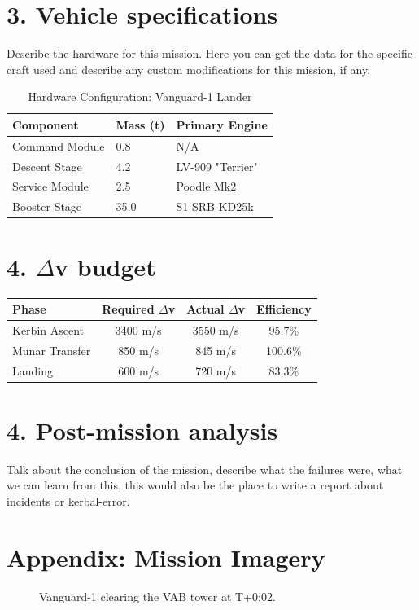 \documentclass[11pt, a4paper]{article}
\begin{document}
\section{3. Vehicle specifications}
Describe the hardware for this mission. Here you can get the data for
the specific craft used and describe any custom modifications for this
mission, if any.

\begin{table}[h]
    \centering
    \caption{Hardware Configuration: Vanguard-1 Lander}
    \vspace{2mm}
    \begin{tabular}{@{}lll@{}}
        \toprule
        \textbf{Component} & \textbf{Mass (t)} & \textbf{Primary Engine} \\ \midrule
        Command Module      & 0.8               & N/A                     \\
        Descent Stage       & 4.2               & LV-909 "Terrier"        \\
        Service Module      & 2.5               & Poodle Mk2              \\
        Booster Stage       & 35.0              & S1 SRB-KD25k            \\ \bottomrule
    \end{tabular}
\end{table}

\section{4. $\Delta$v budget}
\begin{table}[h]
    \centering
    \begin{tabular}{|l|c|c|c|}
    \hline
    \textbf{Phase} & \textbf{Required $\Delta$v} & \textbf{Actual $\Delta$v} & \textbf{Efficiency} \\ \hline
    Kerbin Ascent  & 3400 m/s                    & 3550 m/s                 & 95.7\%              \\ \hline
    Munar Transfer & 850 m/s                     & 845 m/s                  & 100.6\%             \\ \hline
    Landing        & 600 m/s                     & 720 m/s                  & 83.3\%              \\ \hline
    \end{tabular}
\end{table}

\section{4. Post-mission analysis}
Talk about the conclusion of the mission, describe what the failures
were, what we can learn from this, this would also be the place to
write a report about incidents or kerbal-error.

\newpage
\section{Appendix: Mission Imagery}
\begin{figure}[h]
    \centering
    \caption{Vanguard-1 clearing the VAB tower at T+0:02.}
\end{figure}
\end{document}
